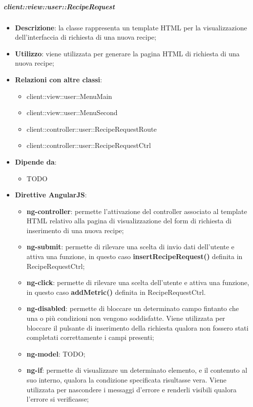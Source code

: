 		\subparagraph{client::view::user::RecipeRequest} %
		\label{subp:bdsm_app_client_view_user_reciperequest}
			\begin{itemize}
				\item \textbf{Descrizione}: la classe rappresenta un template HTML per la visualizzazione dell'interfaccia di richiesta di una nuova recipe;
				\item \textbf{Utilizzo}: viene utilizzata per generare la pagina HTML di richiesta di una nuova recipe;
				\item \textbf{Relazioni con altre classi}:
					\begin{itemize}
						\item client::view::user::MenuMain
						\item client::view::user::MenuSecond
						\item client::controller::user::RecipeRequestRoute
						\item client::controller::user::RecipeRequestCtrl
					\end{itemize}
				\item \textbf{Dipende da}:
					\begin{itemize}
						\item TODO
					\end{itemize}
				\item \textbf{Direttive AngularJS}:
					\begin{itemize}
						\item \textbf{ng-controller}: permette l'attivazione del controller associato al template HTML relativo alla pagina di visualizzazione del form di richiesta di inserimento di una nuova recipe;
						\item \textbf{ng-submit}: permette di rilevare una scelta di invio dati dell'utente e attiva una funzione, in questo caso \textbf{insertRecipeRequest()} definita in RecipeRequestCtrl;
						\item \textbf{ng-click}: permette di rilevare una scelta dell'utente e attiva una funzione, in questo caso \textbf{addMetric()} definita in RecipeRequestCtrl.
						\item \textbf{ng-disabled}: permette di bloccare un determinato campo fintanto che una o più condizioni non vengono soddisfatte. Viene utilizzata per bloccare il pulsante di inserimento della richiesta qualora non fossero stati completati correttamente i campi presenti;
						\item \textbf{ng-model}: TODO;
						\item \textbf{ng-if}: permette di visualizzare un determinato elemento, e il contenuto al suo interno, qualora la condizione specificata risultasse vera. Viene utilizzata per nascondere i messaggi d'errore e renderli visibili qualora l'errore si verificasse;

\end{itemize}
\end{itemize}
